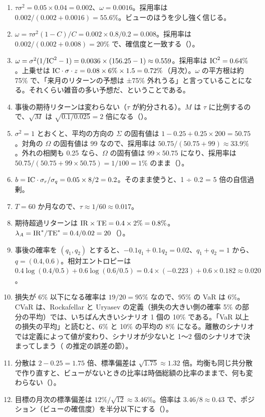 \begin{enumerate}[label=\textbf{問 \arabic*.},leftmargin=3.2em]
\item $\tau\sigma^2=0.05\times0.04=0.002$、$\omega=0.0016$。採用率は $0.002/(0.002+0.0016)=55.6\%$。ビューのほうを少し強く信じる。

\item $\omega=\tau\sigma^2(1-C)/C=0.002\times0.8/0.2=0.008$。採用率は $0.002/(0.002+0.008)=20\%$ で、確信度と一致する（）。

\item $\omega=\sigma^2(1/\mathrm{IC}^2-1)=0.0036\times(156.25-1)\approx0.559$。採用率は $\mathrm{IC}^2=0.64\%$。上乗せは $\mathrm{IC}\cdot\sigma\cdot z=0.08\times6\%\times1.5=0.72\%$（月次）。$\omega$ の平方根は約 75\% で、「来月のリターンの予想は ±75\% 外れうる」と言っていることになる。それくらい雑音の多い予想だ、ということである。

\item 事後の期待リターンは変わらない（$\tau$ が約分される）。$M$ は $\tau$ に比例するので、$\sqrt M$ は $\sqrt{0.1/0.025}=2$ 倍になる（）。

\item $\sigma^2=1$ とおくと、平均の方向の $\Sigma$ の固有値は $1-0.25+0.25\times200=50.75$。対角の $\Omega$ の固有値は 99 なので、採用率は $50.75/(50.75+99)\approx33.9\%$。外れの相関も 0.25 なら、$\Omega$ の固有値は $99\times50.75$ になり、採用率は $50.75/(50.75+99\times50.75)=1/100=1\%$ のまま（）。

\item $b=\mathrm{IC}\cdot\sigma_r/\sigma_q=0.05\times8/2=0.2$。そのまま使うと、1 ÷ 0.2 = 5 倍の自信過剰。

\item $T=60$ か月なので、$\tau\approx1/60\approx0.017$。

\item 期待超過リターンは $\mathrm{IR}\times\mathrm{TE}=0.4\times2\%=0.8\%$。$\lambda_A=\mathrm{IR}^*/\mathrm{TE}^*=0.4/0.02=20$（）。

\item 事後の確率を $(q_1,q_2)$ とすると、$-0.1q_1+0.1q_2=0.02$、$q_1+q_2=1$ から、$q=(0.4,0.6)$。相対エントロピーは $0.4\log(0.4/0.5)+0.6\log(0.6/0.5)=0.4\times(-0.223)+0.6\times0.182\approx0.020$。

\item 損失が 6\% 以下になる確率は $19/20=95\%$ なので、95\% の VaR は 6\%。CVaR は、Rockafellar と Uryasev の定義（損失の大きい側の確率 5\% の部分の平均）では、いちばん大きいシナリオ 1 個の 10\% である。「VaR 以上の損失の平均」と読むと、6\% と 10\% の平均の 8\% になる。離散のシナリオでは定義によって値が変わり、シナリオが少ないと 1〜2 個のシナリオで決まってしまう（ の推定の誤差の節）。

\item 分散は $2-0.25=1.75$ 倍、標準偏差は $\sqrt{1.75}\approx1.32$ 倍。均衡も同じ共分散で作り直すと、ビューがないときの比率は時価総額の比率のままで、何も変わらない（）。

\item 目標の月次の標準偏差は $12\%/\sqrt{12}\approx3.46\%$。倍率は $3.46/8\approx0.43$ で、ポジション（ビューの確信度）を半分以下にする（）。
\end{enumerate}
